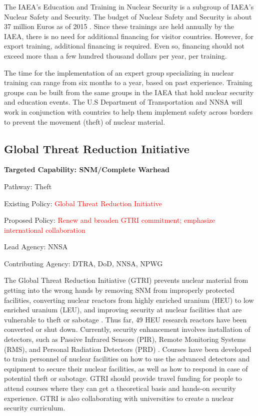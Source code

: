 \documentclass{report}
\begin{document}

The IAEA's Education and Training in Nuclear Security is a subgroup of IAEA's Nuclear Safety and Security. The budget of  Nuclear Safety and Security is about 37 million Euros  as of 2015 \cite{Iaea2014}. Since these trainings are held annually by the IAEA, there is no need for additional financing for visitor countries. However, for export training, additional financing is required. Even so, financing should not exceed more than a few hundred thousand dollars per year, per training. 

The time for the implementation of an  expert group specializing in nuclear training can range from six months to a year, based on past experience.  Training groups can be built from the same groups in the IAEA that hold nuclear security and education events. The U.S Department of Transportation and NNSA  will work in conjunction with countries to help them implement safety across borders to prevent the movement (theft) of nuclear material. 




\subsection{Global Threat Reduction Initiative} \label{sec:GTRI}



\bfseries Targeted Capability: SNM/Complete Warhead

Pathway: Theft

Existing Policy:  \textcolor{red}{Global Threat Reduction Initiative}

Proposed Policy:  \textcolor{red}{Renew and broaden GTRI commitment; emphasize international  collaboration }

Lead Agency: NNSA


Contributing Agency: DTRA, DoD, NNSA, NPWG  \normalfont




The Global Threat Reduction Initiative (GTRI) prevents nuclear material from getting into the wrong hands by removing SNM from improperly protected facilities, converting nuclear  reactors from highly enriched uranium (HEU) to low enriched uranium (LEU), and improving security at nuclear facilities that are vulnerable to theft or sabotage \cite{NationalNuclearSecurityAdministration2014}. Thus far, 49 HEU research reactors have been converted or shut down. Currently, security enhancement involves installation of detectors, such as Passive Infrared Sensors (PIR), Remote Monitoring Systems (RMS), and Personal Radiation Detectors (PRD) \cite{NationalNuclearSecurityAdministrationa}. Courses have been developed to train personnel of nuclear facilities on how to use the advanced detectors and equipment to secure their nuclear facilities, as well as how to respond in case of potential theft or sabotage. GTRI should provide travel funding for people to attend courses where they can get a theoretical basis and hands-on security experience. GTRI is also collaborating with universities to create a nuclear security curriculum.
\end{document}
